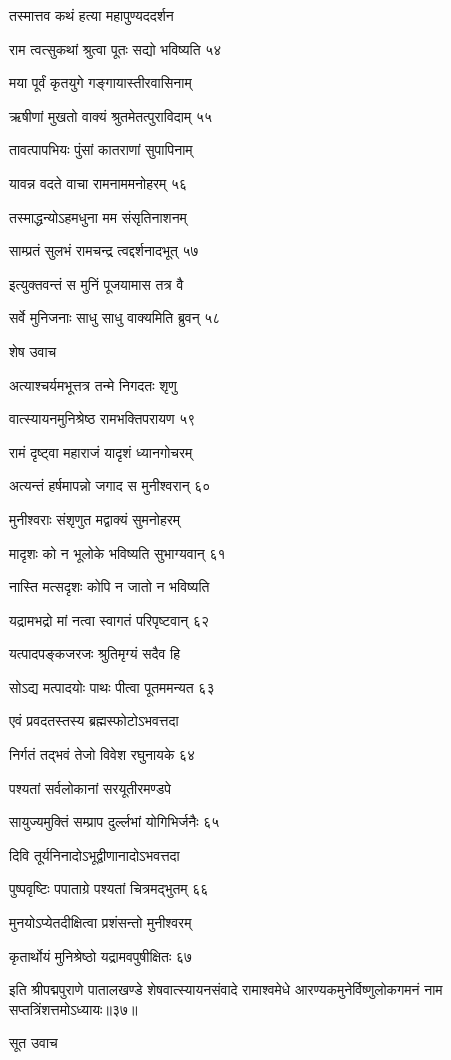 तस्मात्तव कथं हत्या महापुण्यददर्शन

राम त्वत्सुकथां श्रुत्वा पूतः सद्यो भविष्यति ५४

मया पूर्वं कृतयुगे गङ्गायास्तीरवासिनाम्

ऋषीणां मुखतो वाक्यं श्रुतमेतत्पुराविदाम् ५५

तावत्पापभियः पुंसां कातराणां सुपापिनाम्

यावन्न वदते वाचा रामनाममनोहरम् ५६

तस्माद्धन्योऽहमधुना मम संसृतिनाशनम्

साम्प्रतं सुलभं रामचन्द्र त्वद्दर्शनादभूत् ५७

इत्युक्तवन्तं स मुनिं पूजयामास तत्र वै

सर्वे मुनिजनाः साधु साधु वाक्यमिति ब्रुवन् ५८

शेष उवाच

अत्याश्चर्यमभूत्तत्र तन्मे निगदतः शृणु

वात्स्यायनमुनिश्रेष्ठ रामभक्तिपरायण ५९

रामं दृष्ट्वा महाराजं यादृशं ध्यानगोचरम्

अत्यन्तं हर्षमापन्नो जगाद स मुनीश्वरान् ६०

मुनीश्वराः संशृणुत मद्वाक्यं सुमनोहरम्

मादृशः को न भूलोके भविष्यति सुभाग्यवान् ६१

नास्ति मत्सदृशः कोपि न जातो न भविष्यति

यद्रामभद्रो मां नत्वा स्वागतं परिपृष्टवान् ६२

यत्पादपङ्कजरजः श्रुतिमृग्यं सदैव हि

सोऽद्य मत्पादयोः पाथः पीत्वा पूतममन्यत ६३

एवं प्रवदतस्तस्य ब्रह्मस्फोटोऽभवत्तदा

निर्गतं तद्भवं तेजो विवेश रघुनायके ६४

पश्यतां सर्वलोकानां सरयूतीरमण्डपे

सायुज्यमुक्तिं सम्प्राप दुर्ल्लभां योगिभिर्जनैः ६५

दिवि तूर्यनिनादोऽभूद्वीणानादोऽभवत्तदा

पुष्पवृष्टिः पपाताग्रे पश्यतां चित्रमद्भुतम् ६६

मुनयोऽप्येतदीक्षित्वा प्रशंसन्तो मुनीश्वरम्

कृतार्थोयं मुनिश्रेष्ठो यद्रामवपुषीक्षितः ६७

इति श्रीपद्मपुराणे पातालखण्डे शेषवात्स्यायनसंवादे रामाश्वमेधे आरण्यकमुनेर्विष्णुलोकगमनं नाम सप्तत्रिंशत्तमोऽध्यायः॥३७॥


सूत उवाच

